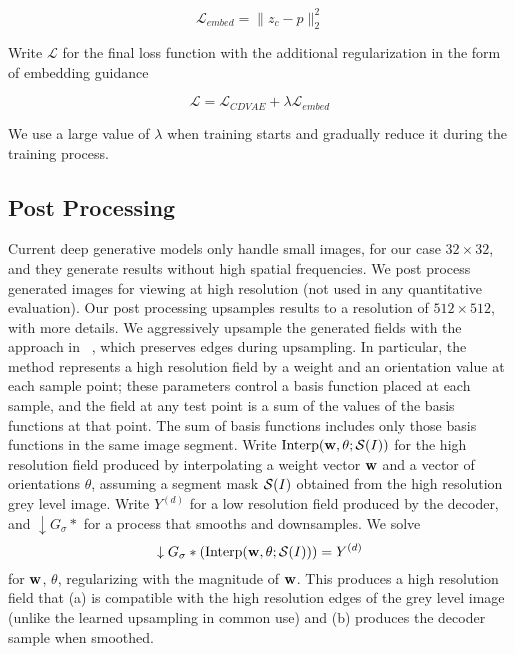 \documentclass[10pt,twocolumn,letterpaper]{article}
\newcommand{\vect}[1]{{\bf {#1}}}
\begin{document}
\begin{equation}
\mathcal{L}_{embed} = \| z_c-p \|_{2}^2
\end{equation}


Write $\mathcal{L}$ for the final loss function with the additional regularization in the 
form of embedding guidance

\begin{equation}
\mathcal{L} = \mathcal{L}_{CDVAE}+ \lambda \mathcal{L}_{embed}
\label{eq:loss}
\end{equation}

We use a large value of $\lambda$ when training starts and gradually reduce it 
during the training process.

\subsection{Post Processing}
\label{sec:postprocess}
Current deep generative models only handle small images, for our case $32 \times 32$, and 
they generate results without high spatial frequencies. We post process generated images 
for viewing at high resolution (not used in any quantitative evaluation). Our post processing 
upsamples results to a resolution of $512 \times 512$, with more details.  We aggressively 
upsample the generated fields with the approach in ~\cite{lu2015sparse}, which preserves edges during 
upsampling. In particular, the method represents a high resolution field by a weight and
an orientation value at each  sample point; these parameters control a basis function placed at each sample, and the
field at any test point is a sum  of the values of the basis functions at that point. 
The sum of basis functions includes only those basis functions in the same image segment. 
Write $\mbox{Interp}(\vect{w}, \theta; {\cal S}(I))$ for the
high resolution field produced by interpolating a weight vector $\vect{w}$ and a vector of orientations $\theta$,
assuming a segment mask ${\cal S}(I)$ obtained from the high resolution grey level image.   Write $Y^{(d)}$ for a low
resolution field produced by the decoder, and $\downarrow G_\sigma *$ for a process that smooths and
downsamples.  We solve
\[
\downarrow G_\sigma *(\mbox{Interp}(\vect{w}, \theta; {\cal S}(I))) = Y^{(d)}
\]
for $\vect{w}$, $\theta$, regularizing with the magnitude of $\vect{w}$.  This produces a high resolution field that (a) is compatible with
the high resolution edges of the grey level image (unlike the learned upsampling in common use) and (b) produces the decoder sample when smoothed.
\end{document}
